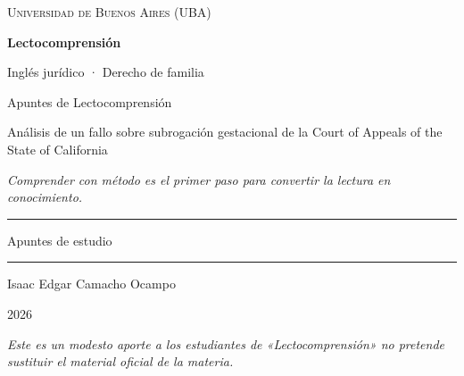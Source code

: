 \documentclass[12pt,oneside]{book}
\newcommand{\universidad}{Universidad de Buenos Aires (UBA)}
\newcommand{\materia}{Lectocomprensión}
\newcommand{\submateria}{Inglés jurídico · Derecho de familia}
\newcommand{\titulo}{Apuntes de Lectocomprensión}
\newcommand{\subtitulo}{Análisis de un fallo sobre subrogación gestacional de la Court of Appeals of the State of California}
\newcommand{\autor}{Isaac Edgar Camacho Ocampo}
\newcommand{\anio}{2026}
\begin{document}
\begin{titlepage}

\thispagestyle{empty}

\begin{center}

\vspace*{1cm}

{\large \textsc{\universidad}}

\vspace{3cm}

{\Huge \textbf{\materia}}

\vspace{0.4cm}

{\large \submateria}

\vspace{1cm}

{\LARGE \titulo}

\vspace{0.4cm}

{\large \subtitulo}

\vspace{0.8cm}

\textit{Comprender con método es el primer paso para convertir la lectura en conocimiento.}

\vspace{1.2cm}

\rule{0.70\textwidth}{0.5pt}

\vspace{0.5cm}

{\large Apuntes de estudio}

\vspace{0.5cm}

\rule{0.70\textwidth}{0.5pt}

\vfill

{\large \autor}

\vspace{0.3cm}

{\large \anio}

\end{center}

\vfill

\begin{flushleft}
\textit{Este es un modesto aporte a los estudiantes de «Lectocomprensión» no pretende sustituir el material oficial de la materia.}
\end{flushleft}

\end{titlepage}
\end{document}
